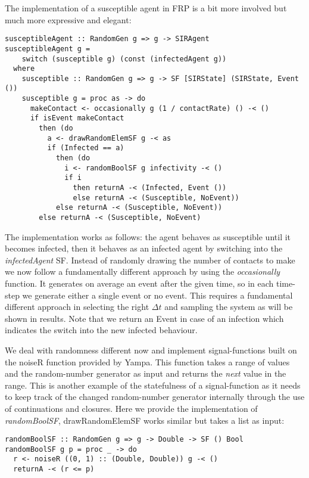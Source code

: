 The implementation of a susceptible agent in FRP is a bit more involved but much more expressive and elegant:

\begin{verbatim}
susceptibleAgent :: RandomGen g => g -> SIRAgent
susceptibleAgent g = 
    switch (susceptible g) (const (infectedAgent g))
  where
    susceptible :: RandomGen g => g -> SF [SIRState] (SIRState, Event ())
    susceptible g = proc as -> do
      makeContact <- occasionally g (1 / contactRate) () -< ()
      if isEvent makeContact
        then (do
          a <- drawRandomElemSF g -< as
          if (Infected == a)
            then (do
              i <- randomBoolSF g infectivity -< ()
              if i
                then returnA -< (Infected, Event ())
                else returnA -< (Susceptible, NoEvent))
            else returnA -< (Susceptible, NoEvent))
        else returnA -< (Susceptible, NoEvent)
\end{verbatim}

The implementation works as follows: the agent behaves as susceptible until it becomes infected, then it behaves as an infected agent by switching into the \textit{infectedAgent} SF.
Instead of randomly drawing the number of contacts to make we now follow a fundamentally different approach by using the \textit{occasionally} function. It generates on average an event after the given time, so in each time-step we generate either a single event or no event. This requires a fundamental different approach in selecting the right $\Delta t$ and sampling the system as will be shown in results. Note that we return an Event in case of an infection which indicates the switch into the new infected behaviour.

We deal with randomness different now and implement signal-functions built on the noiseR function provided by Yampa. This function takes a range of values and the random-number generator as input and returns the \textit{next} value in the range. This is another example of the statefulness of a signal-function as it needs to keep track of the changed random-number generator internally through the use of continuations and closures. Here we provide the implementation of \textit{randomBoolSF}, drawRandomElemSF works similar but takes a list as input:

\begin{verbatim}
randomBoolSF :: RandomGen g => g -> Double -> SF () Bool
randomBoolSF g p = proc _ -> do
  r <- noiseR ((0, 1) :: (Double, Double)) g -< ()
  returnA -< (r <= p)
\end{verbatim}

